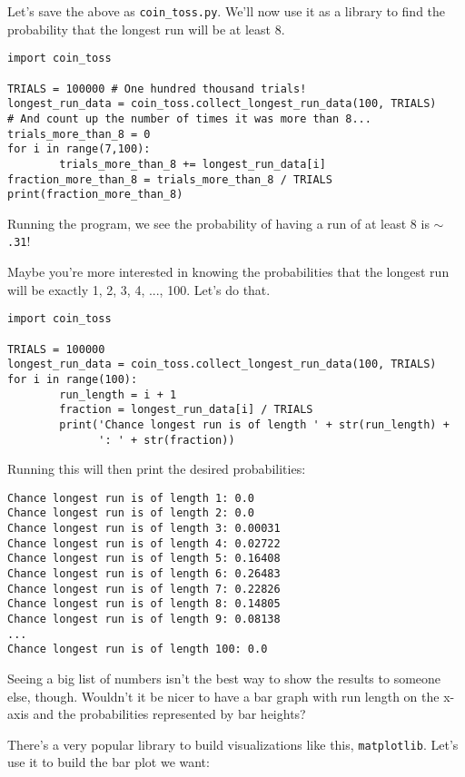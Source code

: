 Let's save the above as \texttt{coin\_toss.py}. We'll now use it as a library to find the probability that the longest run will be at least 8.

\begin{lstlisting}
import coin_toss

TRIALS = 100000 # One hundred thousand trials!
longest_run_data = coin_toss.collect_longest_run_data(100, TRIALS)
# And count up the number of times it was more than 8...
trials_more_than_8 = 0
for i in range(7,100):
        trials_more_than_8 += longest_run_data[i]
fraction_more_than_8 = trials_more_than_8 / TRIALS
print(fraction_more_than_8)
\end{lstlisting}

Running the program, we see the probability of having a run of at least 8 is $\sim$\texttt{.31}! 

Maybe you're more interested in knowing the probabilities that the longest run will be exactly 1, 2, 3, 4, ..., 100. Let's do that.

\begin{lstlisting}
import coin_toss

TRIALS = 100000
longest_run_data = coin_toss.collect_longest_run_data(100, TRIALS)
for i in range(100):
        run_length = i + 1
        fraction = longest_run_data[i] / TRIALS
        print('Chance longest run is of length ' + str(run_length) + 
        	  ': ' + str(fraction))
\end{lstlisting}

Running this will then print the desired probabilities:

\begin{lstlisting}[numbers=none]
Chance longest run is of length 1: 0.0
Chance longest run is of length 2: 0.0
Chance longest run is of length 3: 0.00031
Chance longest run is of length 4: 0.02722
Chance longest run is of length 5: 0.16408
Chance longest run is of length 6: 0.26483
Chance longest run is of length 7: 0.22826
Chance longest run is of length 8: 0.14805
Chance longest run is of length 9: 0.08138
...
Chance longest run is of length 100: 0.0
\end{lstlisting}

Seeing a big list of numbers isn't the best way to show the results to someone else, though. Wouldn't it be nicer to have a bar graph with run length on the x-axis and the probabilities represented by bar heights? 

There's a very popular library to build visualizations like this, \texttt{matplotlib}. Let's use it to build the bar plot we want:

